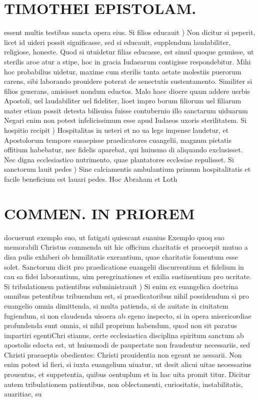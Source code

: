 \documentclass{article}
\begin{document}
\begin{pages}
\section*{TIMOTHEI EPISTOLAM. }
\marginpar{[ p.127 ]}\pstart essent multis testibus sancta opera eius.  \pend\pstart Si filios educauit ) Non dicitur si peperit, licet id uideri possit significasse, sed si educauit, supplendum laudabiliter, religiose, honeste. Quod si utuidetur filias educasse, est simul quoque genuisse, ut sterilis aroe atur a stipe, hoc in gracia Iudaearum contigisse respondebitur. Mihi hoc probabilius uidetur, maxime cum sterilis tanta aetate molestiis puerorum carens, sibi laborando prouidere poterat de senectutis sustentamento. Similiter si filios generans, amisisset nondum eductos. Malo haec dioere quam addere uerbis Apostoli, uel laudabiliter uel fideliter, lioet impro borum filiorum uel filiarum mater etiam possit detesta bilisuisa fuisse contubernio illo sanctarum uiduarum Negari enim non potest infelicissimum esse apud Iudaeos uxoris sterilitatem.  \pend\pstart Si hospitio recipit ) Hospitalitas in ueteri et no ua lege impense laudetur, et Apostolorum tempore susaepisse praedicatores cuangelii, magnum pietatis offitium habebatur, nec fidelis aparebat, qui huiusmo di aliquando exclusisset. Nec digna ecclesiastico nutrimento, quae plantatores ecclesiae repulisset.  \pend\pstart Si sanctorum lauit pedes ) Sine calciamentis ambulantium primum hospitalitatis et facile beneficium est lauari pedes. Hoc Abraham et Loth  \pend
\section*{COMMEN. IN PRIOREM }
\marginpar{[ p.128 ]}\pstart docuerunt exemplo suo, ut fatigati quiescant suauius Exemplo quoq suo memorabili Christus commenda uit hic officium charitatis et praeoepit mutuo a disa pulis exhiberi ob humilitatis exerantium, quae charitatis fomentum esse solet. Sanctorum dicit pro praedicatione euangelii discurrentium et fidelium in cau sa fidei laborantium, uim peregrinationes et exilia sustinentium pro ucritate.  \pend\pstart Si tribulationem patientibus subministrauit ) Si enim ex euangelica doctrina omnibus petentibus tribuendum est, si praedicatoribus nihil possidendum si pro euangelio omnia dimittenda, si multa patienda, si de auitate in ciuitatem fugiendum, si non claudenda uisoera ab egeno inspecto, si in opera misericordiae profundenda sunt omnia, si nihil proprium habendum, quod non sit paratus impartiri egentiChri stianus, certe ecclesiastica disciplina spiritum sanctum ab apostolis edocta est, ut huiusmodi de paupertate non fraudentur necessariis, sed Christi praeaeptis obedientes: Christi prouidentia non egeant ne aessarii. Non enim potest id fieri, si iuxta euangelium uiuatur, ut desit alicui uitae neoessarius prouentus, et suppetentia, quibus oentuplum et in hac uita promit titur. Dicitur autem tribulationem patientibus, non oblectamenti, curiositatis, instabilitatis, auaritiae, su\pend

\end{pages}
\end{document}
